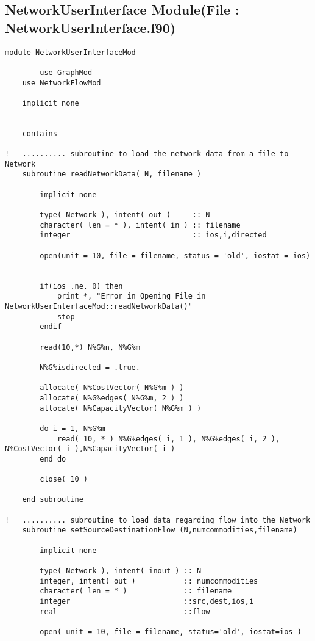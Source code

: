 \documentclass[10pt,a4paper,margin = 1.25cm]{article}
\begin{document}
\subsection*{NetworkUserInterface Module(File : NetworkUserInterface.f90) }
\begin{lstlisting}
module NetworkUserInterfaceMod
		
		use GraphMod
    use NetworkFlowMod
    
    implicit none
    
    
    contains
    
!   .......... subroutine to load the network data from a file to Network     
    subroutine readNetworkData( N, filename )
        
        implicit none
        
        type( Network ), intent( out )     :: N
        character( len = * ), intent( in ) :: filename
        integer                            :: ios,i,directed
        
        open(unit = 10, file = filename, status = 'old', iostat = ios)
        
        
        if(ios .ne. 0) then
            print *, "Error in Opening File in NetworkUserInterfaceMod::readNetworkData()"
            stop
        endif
        
        read(10,*) N%G%n, N%G%m
        
        N%G%isdirected = .true.
        
        allocate( N%CostVector( N%G%m ) )
        allocate( N%G%edges( N%G%m, 2 ) )
        allocate( N%CapacityVector( N%G%m ) )
        
        do i = 1, N%G%m
            read( 10, * ) N%G%edges( i, 1 ), N%G%edges( i, 2 ), N%CostVector( i ),N%CapacityVector( i ) 
        end do
        
        close( 10 )

    end subroutine
    
!   .......... subroutine to load data regarding flow into the Network    
    subroutine setSourceDestinationFlow_(N,numcommodities,filename)
        
        implicit none

        type( Network ), intent( inout ) :: N
        integer, intent( out )           :: numcommodities
        character( len = * )             :: filename
        integer                          ::src,dest,ios,i
        real                             ::flow
        
        open( unit = 10, file = filename, status='old', iostat=ios )
        

\end{lstlisting}
\end{document}
